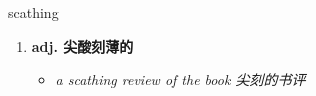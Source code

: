 
\begin{frame}
{\huge scathing}
\begin{center}
\begin{enumerate}\Large
  \item \textbf{adj. 尖酸刻薄的}
  \begin{itemize}
    \item \em{\Large{a scathing review of the book 尖刻的书评}}
  \end{itemize}
\end{enumerate}
\end{center}
\end{frame}
